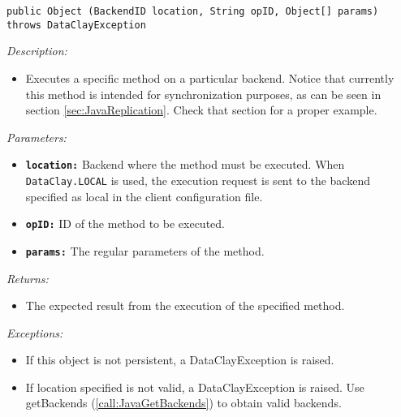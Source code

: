 \begin{dBox}
\texttt{public Object (BackendID location, \newline String opID, Object[] params) throws DataClayException}
\LINE

{\it Description:}

\begin{itemize}
    \item Executes a specific method on a particular backend. Notice that currently this method is intended for synchronization purposes, as can be seen in
  section \ref{sec:JavaReplication}. Check that section for a proper example.
\end{itemize}

{\it Parameters:}

\begin{itemize}
    \item \texttt{\bfseries location:} Backend where the method must be executed. When \texttt{DataClay.LOCAL} is used, the execution request is sent to the backend specified as local in the client configuration file.
    \item \texttt{\bfseries opID:} ID of the method to be executed.
    \item \texttt{\bfseries params:} The regular parameters of the method.
\end{itemize}
 
{\it Returns:}

\begin{itemize}
    \item The expected result from the execution of the specified method.
\end{itemize}

{\it Exceptions:}

\begin{itemize}
    \item If this object is not persistent, a DataClayException is raised.
    \item If location specified is not valid, a DataClayException is raised. Use getBackends (\ref{call:JavaGetBackends}) to obtain valid backends.
\end{itemize}

\end{dBox}



